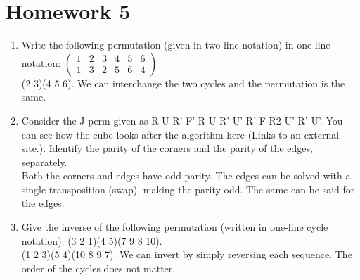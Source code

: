 \documentclass[11pt]{article}
\begin{document}
\section{Homework 5}
\begin{enumerate}
    \item Write the following permutation (given in two-line notation) in one-line notation: $\begin{pmatrix}
    1 & 2 & 3 & 4 & 5 & 6\\
    1 & 3 & 2 & 5 & 6 & 4
    \end{pmatrix}$\\
    (2 3)(4 5 6). We can interchange the two cycles and the permutation is the same.
    \item Consider the J-perm given as R U R' F' R U R' U' R' F R2 U' R' U'. You can see how the cube looks after the algorithm here (Links to an external site.). Identify the parity of the corners and the parity of the edges, separately.\\
    Both the corners and edges have odd parity. The edges can be solved with a single transposition (swap), making the parity odd. The same can be said for the edges.
    
    \item Give the inverse of the following permutation (written in one-line cycle notation): (3 2 1)(4 5)(7 9 8 10). \\
    (1 2 3)(5 4)(10 8 9 7). We can invert by simply reversing each sequence. The order of the cycles does not matter.
\end{enumerate}
\end{document}
